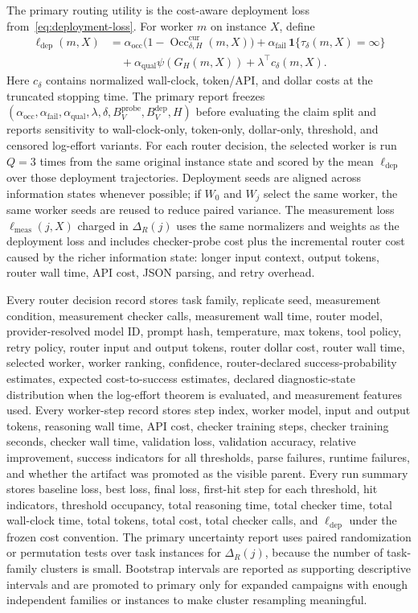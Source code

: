 \documentclass{article}
\DeclareMathOperator{\Occ}{Occ}
\newcommand{\one}{\mathbf{1}}
\begin{document}
The primary routing utility is the cost-aware deployment loss from~\eqref{eq:deployment-loss}.
For worker $m$ on instance $X$, define
\begin{align*}
\ell_{\mathrm{dep}}(m,X)
&=
\alpha_{\mathrm{occ}}\bigl(1-\Occ_{\delta,H}^{\mathrm{cur}}(m,X)\bigr)
+\alpha_{\mathrm{fail}}\,\one\{\tau_\delta(m,X)=\infty\}
\nonumber\\
&\quad
+\alpha_{\mathrm{qual}}\psi(G_H(m,X))
+\lambda^\top c_\delta(m,X).
\end{align*}
Here $c_\delta$ contains normalized wall-clock, token/API, and dollar costs at the truncated stopping time.
The primary report freezes $(\alpha_{\mathrm{occ}},\alpha_{\mathrm{fail}},\alpha_{\mathrm{qual}},\lambda,\delta,B_V^{\mathrm{probe}},B_V^{\mathrm{dep}},H)$ before evaluating the claim split and reports sensitivity to wall-clock-only, token-only, dollar-only, threshold, and censored log-effort variants.
For each router decision, the selected worker is run $Q=3$ times from the same original instance state and scored by the mean $\ell_{\mathrm{dep}}$ over those deployment trajectories.
Deployment seeds are aligned across information states whenever possible; if $W_0$ and $W_j$ select the same worker, the same worker seeds are reused to reduce paired variance.
The measurement loss $\ell_{\mathrm{meas}}(j,X)$ charged in $\Delta_R(j)$ uses the same normalizers and weights as the deployment loss and includes checker-probe cost plus the incremental router cost caused by the richer information state: longer input context, output tokens, router wall time, API cost, JSON parsing, and retry overhead.

Every router decision record stores task family, replicate seed, measurement condition, measurement checker calls, measurement wall time, router model, provider-resolved model ID, prompt hash, temperature, max tokens, tool policy, retry policy, router input and output tokens, router dollar cost, router wall time, selected worker, worker ranking, confidence, router-declared success-probability estimates, expected cost-to-success estimates, declared diagnostic-state distribution when the log-effort theorem is evaluated, and measurement features used.
Every worker-step record stores step index, worker model, input and output tokens, reasoning wall time, API cost, checker training steps, checker training seconds, checker wall time, validation loss, validation accuracy, relative improvement, success indicators for all thresholds, parse failures, runtime failures, and whether the artifact was promoted as the visible parent.
Every run summary stores baseline loss, best loss, final loss, first-hit step for each threshold, hit indicators, threshold occupancy, total reasoning time, total checker time, total wall-clock time, total tokens, total cost, total checker calls, and $\ell_{\mathrm{dep}}$ under the frozen cost convention.
The primary uncertainty report uses paired randomization or permutation tests over task instances for $\Delta_R(j)$, because the number of task-family clusters is small.
Bootstrap intervals are reported as supporting descriptive intervals and are promoted to primary only for expanded campaigns with enough independent families or instances to make cluster resampling meaningful.
\end{document}
